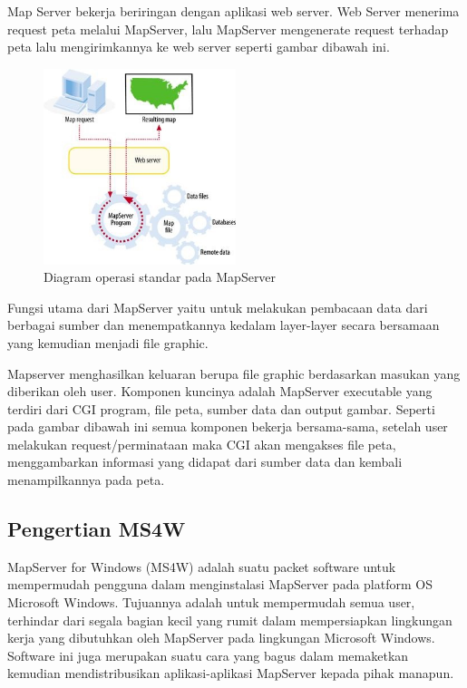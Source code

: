 Map Server bekerja beriringan dengan aplikasi web server. Web Server menerima request peta melalui MapServer, lalu MapServer mengenerate request terhadap peta lalu mengirimkannya ke web server seperti gambar dibawah ini.
\begin{figure}[ht]
	    \centerline{\includegraphics[width=0.50\textwidth]{figures/gambar5.JPG}}
	    \caption{Diagram operasi standar pada MapServer}
		\label{gambar5}
		\end{figure}
Fungsi utama dari MapServer yaitu untuk melakukan pembacaan data dari berbagai sumber dan menempatkannya kedalam layer-layer secara bersamaan yang kemudian menjadi file graphic.

Mapserver menghasilkan keluaran berupa file graphic berdasarkan masukan yang diberikan oleh user. Komponen kuncinya adalah MapServer executable yang terdiri dari CGI program, file peta, sumber data dan output gambar. Seperti pada gambar dibawah ini semua komponen bekerja bersama-sama, setelah user melakukan request/perminataan maka CGI akan mengakses file peta, menggambarkan informasi yang didapat dari sumber data dan kembali menampilkannya pada peta.

\subsection{Pengertian MS4W}
MapServer for Windows (MS4W) adalah suatu packet software untuk mempermudah pengguna dalam menginstalasi MapServer pada platform OS Microsoft Windows. Tujuannya adalah untuk mempermudah semua user, terhindar dari segala bagian kecil yang rumit dalam mempersiapkan lingkungan kerja yang dibutuhkan oleh MapServer pada lingkungan Microsoft Windows. Software ini juga merupakan suatu cara yang bagus dalam memaketkan kemudian mendistribusikan aplikasi-aplikasi MapServer kepada pihak manapun.

